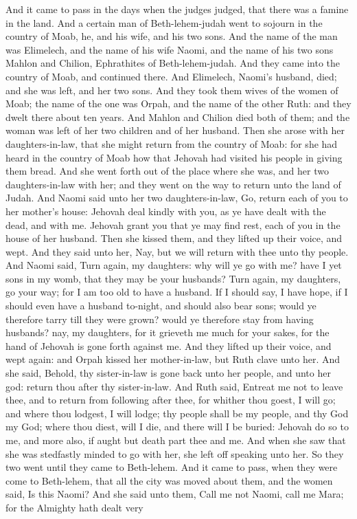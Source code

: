 


And it came to pass in the days when the judges judged, that there was a famine in the land. And a certain man of Beth-lehem-judah went to sojourn in the country of Moab, he, and his wife, and his two sons. And the name of the man was Elimelech, and the name of his wife Naomi, and the name of his two sons Mahlon and Chilion, Ephrathites of Beth-lehem-judah. And they came into the country of Moab, and continued there. And Elimelech, Naomi’s husband, died; and she was left, and her two sons. And they took them wives of the women of Moab; the name of the one was Orpah, and the name of the other Ruth: and they dwelt there about ten years. And Mahlon and Chilion died both of them; and the woman was left of her two children and of her husband.  Then she arose with her daughters-in-law, that she might return from the country of Moab: for she had heard in the country of Moab how that Jehovah had visited his people in giving them bread. And she went forth out of the place where she was, and her two daughters-in-law with her; and they went on the way to return unto the land of Judah. And Naomi said unto her two daughters-in-law, Go, return each of you to her mother’s house: Jehovah deal kindly with you, as ye have dealt with the dead, and with me. Jehovah grant you that ye may find rest, each of you in the house of her husband. Then she kissed them, and they lifted up their voice, and wept. And they said unto her, Nay, but we will return with thee unto thy people. And Naomi said, Turn again, my daughters: why will ye go with me? have I yet sons in my womb, that they may be your husbands? Turn again, my daughters, go your way; for I am too old to have a husband. If I should say, I have hope, if I should even have a husband to-night, and should also bear sons; would ye therefore tarry till they were grown? would ye therefore stay from having husbands? nay, my daughters, for it grieveth me much for your sakes, for the hand of Jehovah is gone forth against me. And they lifted up their voice, and wept again: and Orpah kissed her mother-in-law, but Ruth clave unto her.  And she said, Behold, thy sister-in-law is gone back unto her people, and unto her god: return thou after thy sister-in-law. And Ruth said, Entreat me not to leave thee, and to return from following after thee, for whither thou goest, I will go; and where thou lodgest, I will lodge; thy people shall be my people, and thy God my God; where thou diest, will I die, and there will I be buried: Jehovah do so to me, and more also, if aught but death part thee and me. And when she saw that she was stedfastly minded to go with her, she left off speaking unto her.  So they two went until they came to Beth-lehem. And it came to pass, when they were come to Beth-lehem, that all the city was moved about them, and the women said, Is this Naomi? And she said unto them, Call me not Naomi, call me Mara; for the Almighty hath dealt very 